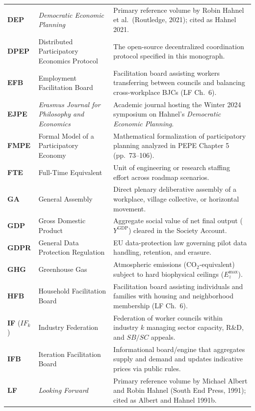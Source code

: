 \documentclass[10pt,twoside,openany]{book}
\theoremstyle{dpepstyle}
\begin{document}
{\begin{longtable}{L{0.92in} L{1.75in} L{1.95in}}
\textbf{DEP} & \emph{Democratic Economic Planning} & Primary reference volume by Robin Hahnel et al.\ (Routledge, 2021); cited as Hahnel 2021. \\
\textbf{DPEP} & Distributed Participatory Economics Protocol & The open-source decentralized coordination protocol specified in this monograph. \\
\textbf{EFB} & Employment Facilitation Board & Facilitation board assisting workers transferring between councils and balancing cross-workplace BJCs (LF Ch.~6). \\
\textbf{EJPE} & \emph{Erasmus Journal for Philosophy and Economics} & Academic journal hosting the Winter 2024 symposium on Hahnel's \emph{Democratic Economic Planning}. \\
\textbf{FMPE} & Formal Model of a Participatory Economy & Mathematical formalization of participatory planning analyzed in PEPE Chapter 5 (pp.~73--106). \\
\textbf{FTE} & Full-Time Equivalent & Unit of engineering or research staffing effort across roadmap scenarios. \\
\textbf{GA} & General Assembly & Direct plenary deliberative assembly of a workplace, village collective, or horizontal movement. \\
\textbf{GDP} & Gross Domestic Product & Aggregate social value of net final output ($Y^{\text{GDP}}$) cleared in the Society Account. \\
\textbf{GDPR} & General Data Protection Regulation & EU data-protection law governing pilot data handling, retention, and erasure. \\
\textbf{GHG} & Greenhouse Gas & Atmospheric emissions ($\text{CO}_2$-equivalent) subject to hard biophysical ceilings ($E_z^{\max}$). \\
\textbf{HFB} & Household Facilitation Board & Facilitation board assisting individuals and families with housing and neighborhood membership (LF Ch.~6). \\
\textbf{IF} ($IF_k$) & Industry Federation & Federation of worker councils within industry $k$ managing sector capacity, R\&D, and $SB/SC$ appeals. \\
\textbf{IFB} & Iteration Facilitation Board & Informational board/engine that aggregates supply and demand and updates indicative prices via public rules. \\
\textbf{LF} & \emph{Looking Forward} & Primary reference volume by Michael Albert and Robin Hahnel (South End Press, 1991); cited as Albert and Hahnel 1991b. \\

\end{longtable}}
\end{document}

